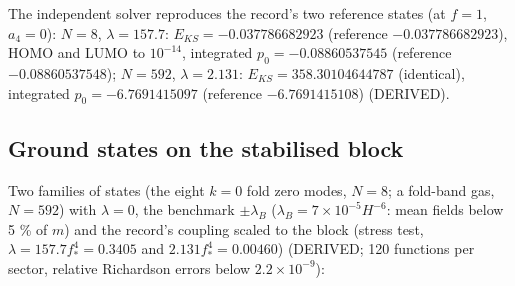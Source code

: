\documentclass[
  10pt,
]{article}
\begin{document}
The independent solver reproduces the record's two reference states (at
\(f = 1\), \(a_4 = 0\)): \(N = 8\), \(\lambda = 157.7\):
\(E_{KS} = -0.037786682923\) (reference \(-0.037786682923\)), HOMO and
LUMO to \(10^{-14}\), integrated \(p_0 = -0.08860537545\) (reference
\(-0.08860537548\)); \(N = 592\), \(\lambda = 2.131\):
\(E_{KS} = 358.30104644787\) (identical), integrated
\(p_0 = -6.7691415097\) (reference \(-6.7691415108\)) (DERIVED).

\hypertarget{ground-states-on-the-stabilised-block}{%
\subsection{Ground states on the stabilised
block}\label{ground-states-on-the-stabilised-block}}

Two families of states (the eight \(k = 0\) fold zero modes, \(N = 8\);
a fold-band gas, \(N = 592\)) with \(\lambda = 0\), the benchmark
\(\pm\lambda_B\) (\(\lambda_B = 7\times10^{-5}H^{-6}\): mean fields
below 5 \% of \(m\)) and the record's coupling scaled to the block
(stress test, \(\lambda = 157.7f_*^4 = 0.3405\) and
\(2.131f_*^4 = 0.00460\)) (DERIVED; 120 functions per sector, relative
Richardson errors below \(2.2\times10^{-9}\)):
\end{document}
